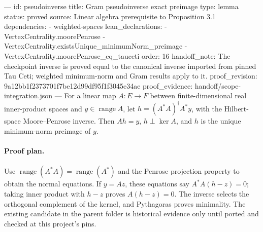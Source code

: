 ---
id: pseudoinverse
title: Gram pseudoinverse exact preimage
type: lemma
status: proved
source: Linear algebra prerequisite to Proposition 3.1
dependencies:
- weighted-spaces
lean_declarations:
- VertexCentrality.moorePenrose
- VertexCentrality.existsUnique_minimumNorm_preimage
- VertexCentrality.moorePenrose_eq_tauceti
order: 16
handoff_note: The checkpoint inverse is proved equal to the canonical inverse imported from pinned Tau Ceti; weighted minimum-norm and Gram results apply to it.
proof_revision: 9a12bb1f2373701f7be12d99df95f1f3045e34ae
proof_evidence: handoff/scope-integration.json
---
For a linear map $A:E\to F$ between finite-dimensional real inner-product spaces and $y\in\operatorname{range}A$, let $h=(A^*A)^\dagger A^*y$, with the Hilbert-space Moore--Penrose inverse. Then $Ah=y$, $h\perp\ker A$, and $h$ is the unique minimum-norm preimage of $y$.

\paragraph{Proof plan.}
Use $\operatorname{range}(A^*A)=\operatorname{range}(A^*)$ and the Penrose projection property to obtain the normal equations. If $y=Az$, these equations say $A^*A(h-z)=0$; taking inner product with $h-z$ proves $A(h-z)=0$. The inverse selects the orthogonal complement of the kernel, and Pythagoras proves minimality. The existing candidate in the parent folder is historical evidence only until ported and checked at this project's pins.
